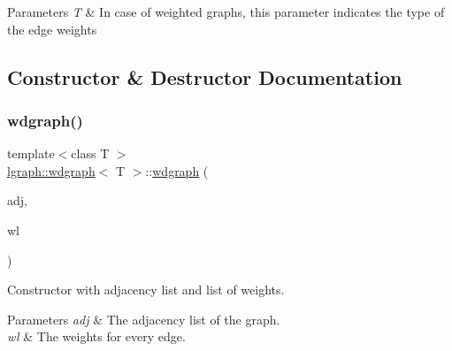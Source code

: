 \begin{DoxyParams}{Parameters}
{\em T} & In case of weighted graphs, this parameter indicates the type of the edge weights \\
\hline
\end{DoxyParams}


\subsection{Constructor \& Destructor Documentation}
\mbox{\label{classlgraph_1_1wdgraph_a80abe8c4fc1312f56e82a71d361b337f}} 
\subsubsection{\texorpdfstring{wdgraph()}{wdgraph()}\hspace{0.1cm}{\footnotesize\ttfamily [1/2]}}
{\footnotesize\ttfamily template$<$class T $>$ \\
\hyperlink{classlgraph_1_1wdgraph}{lgraph\+::wdgraph}$<$ T $>$\+::\hyperlink{classlgraph_1_1wdgraph}{wdgraph} (\begin{DoxyParamCaption}\item[{const std\+::vector$<$ \hyperlink{namespacelgraph_a052e7766c13f3a43cec0aec8173fdede}{neighbourhood} $>$ \&}]{adj,  }\item[{const std\+::vector$<$ \hyperlink{namespacelgraph_a1e0fd5ef0a78b2a92da48adbed265cb6}{weight\+\_\+list}$<$ T $>$ $>$ \&}]{wl }\end{DoxyParamCaption})}



Constructor with adjacency list and list of weights. 


\begin{DoxyParams}{Parameters}
{\em adj} & The adjacency list of the graph. \\
\hline
{\em wl} & The weights for every edge. \\
\hline
\end{DoxyParams}
\mbox{\label{classlgraph_1_1wdgraph_ad76940eece0a10a99e684a8896ac2669}} 
